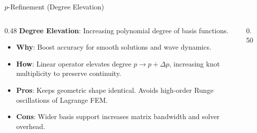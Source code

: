 \begin{frame}{$p$-Refinement (Degree Elevation)}
  \begin{columns}[T]
    \begin{column}{0.48\textwidth}
      \small
      \textbf{Degree Elevation}: Increasing polynomial degree of basis functions.
      \par\vspace{0.15cm}
      \begin{itemize}
        \item \textbf{Why}: Boost accuracy for smooth solutions and wave dynamics.
        \item \textbf{How}: Linear operator elevates degree $p \to p + \Delta p$, increasing knot multiplicity to preserve continuity.
        \item \textbf{Pros}: Keeps geometric shape identical. Avoids high-order Runge oscillations of Lagrange FEM.
        \item \textbf{Cons}: Wider basis support increases matrix bandwidth and solver overhead.
      \end{itemize}
      \par\vspace{0.2cm}
      \centering
      \href{https://cnam-internship-mumen.netlify.app/app/simulations/iga-sim-1.2/}{}
    \end{column}
    \begin{column}{0.50\textwidth}
      \centering
\end{column}
\end{columns}
\end{frame}
